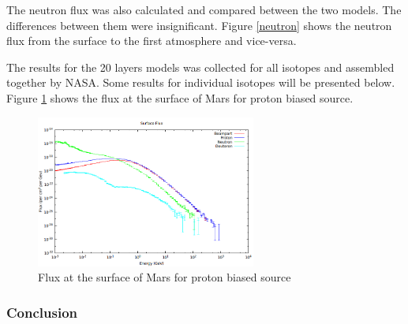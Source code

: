 The neutron flux was also calculated and compared between the two models.
The differences between them were insignificant. Figure \ref{neutron}
shows the neutron flux from the surface to the first atmosphere and vice-versa.

The results for the 20 layers models was collected for all isotopes and
assembled together by NASA. Some results for individual isotopes will be presented below.
Figure \ref{surface20} shows the flux at the surface of Mars for proton biased source.
\begin{figure}
 \begin{centering}
 \centering
 \includegraphics[width=0.4\linewidth,height=5cm]{../figs/surface_z1.png}
 \caption{Flux at the surface of Mars for proton biased source}
 \label{surface20}
 \end{centering}
\end{figure}

\subsubsection{Conclusion}

